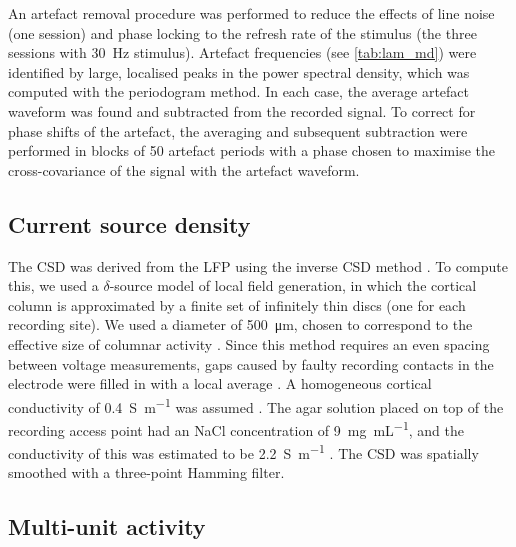 An artefact removal procedure was performed to reduce the effects of line noise (one session) and phase locking to the refresh rate of the stimulus (the three sessions with \SI{30}{Hz} stimulus).
Artefact frequencies (see \autoref{tab:lam_md}) were identified by large, localised peaks in the power spectral density, which was computed with the periodogram method.
In each case, the average artefact waveform was found and subtracted from the recorded signal.
To correct for phase shifts of the artefact, the averaging and subsequent subtraction were performed in blocks of \num{50} artefact periods with a phase chosen to maximise the cross-covariance of the signal with the artefact waveform.


\subsection{Current source density}
\label{sec:lam_csd}

The \ac{CSD} was derived from the \ac{LFP} using the inverse \ac{CSD} method \citep{Pettersen2006}.
To compute this, we used a $\delta$-source model of local field generation, in which the cortical column is approximated by a finite set of infinitely thin discs (one for each recording site).
We used a diameter of \SI{500}{\micro\metre}, chosen to correspond to the effective size of columnar activity \citep{Horton2005,Lund2003}.
Since this method requires an even spacing between voltage measurements, gaps caused by faulty recording contacts in the electrode were filled in with a local average \citep{Wojcik2010}.
A homogeneous cortical conductivity of \SI{0.4}{\siemens\per\metre} was assumed \citep{Logothetis2007}.
The agar solution placed on top of the recording access point had an \ac{NaCl} concentration of \SI{9}{\mg\per\mL}, and the conductivity of this was estimated to be \SI{2.2}{\siemens\per\metre} \citep{Kandadai2012}.
The \ac{CSD} was spatially smoothed with a three-point Hamming filter.


\subsection{Multi-unit activity}


